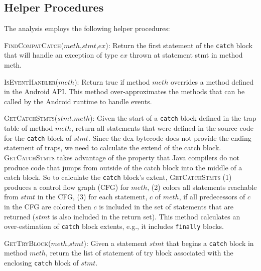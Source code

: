 \subsection{Helper Procedures}

The analysis employs the following helper procedures: 

\begin{description}[leftmargin=0cm,listparindent=0pt,itemindent=0cm]

\item \textsc{FindCompatCatch}($meth$,$stmt$,$ex$): Return the first
  statement of the \lstinline!catch! block that will handle an
  exception of type $ex$ thrown at statement stmt in method meth.

\item \textsc{IsEventHandler}($meth$): Return true if method $meth$
  overrides a method defined in the Android API.  This method
  over-approximates the methods that can be called by the Android
  runtime to handle events.

\item \textsc{GetCatchStmts}($stmt$,$meth$): Given the start of a
  \lstinline!catch! block defined in the trap table of method $meth$,
  return all statements that were defined in the source code for the
  \lstinline!catch! block of $stmt$.  Since the dex bytecode does not
  provide the ending statement of traps, we need to calculate the
  extend of the catch block.  \textsc{GetCatchStmts} takes advantage
  of the property that Java compilers do not produce code that jumps
  from outside of the catch block into the middle of a catch block.
  So to calculate the \lstinline!catch! block's extent,
  \textsc{GetCatchStmts} (1) produces a control flow graph (CFG) for
  $meth$, (2) colors all statements reachable from $stmt$ in the CFG,
  (3) for each statement, $c$ of $meth$, if all predecessors of $c$ in
  the CFG are colored then $c$ is included in the set of statements
  that are returned ($stmt$ is also included in the return set). This
  method calculates an over-estimation of \lstinline!catch! block
  extents, e.g., it includes \lstinline!finally! blocks.

\item \textsc{GetTryBlock}($meth$,$stmt$): Given a statement $stmt$
  that begins a \lstinline!catch! block in method $meth$, return the
  list of statement of try block associated with the enclosing
  \lstinline!catch! block of $stmt$.

\end{description}

